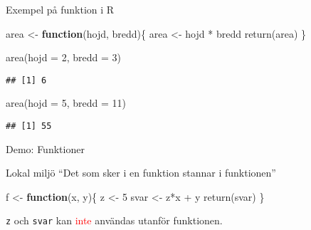 \documentclass[
  10pt,
  ignorenonframetext,
]{beamer}
\newenvironment{Shaded}{\begin{snugshade}}{\end{snugshade}}
\newcommand{\AttributeTok}[1]{\textcolor[rgb]{0.77,0.63,0.00}{#1}}
\newcommand{\ControlFlowTok}[1]{\textcolor[rgb]{0.13,0.29,0.53}{\textbf{#1}}}
\newcommand{\DecValTok}[1]{\textcolor[rgb]{0.00,0.00,0.81}{#1}}
\newcommand{\FunctionTok}[1]{\textcolor[rgb]{0.00,0.00,0.00}{#1}}
\newcommand{\NormalTok}[1]{#1}
\newcommand{\OtherTok}[1]{\textcolor[rgb]{0.56,0.35,0.01}{#1}}
\newcommand{\SpecialCharTok}[1]{\textcolor[rgb]{0.00,0.00,0.00}{#1}}
\begin{document}
\begin{frame}[fragile]{Exempel på funktion i R}
\protect\hypertarget{exempel-puxe5-funktion-i-r}{}
\begin{Shaded}
\begin{Highlighting}[]
\NormalTok{area }\OtherTok{\textless{}{-}} \ControlFlowTok{function}\NormalTok{(hojd, bredd)\{}
\NormalTok{  area }\OtherTok{\textless{}{-}}\NormalTok{ hojd }\SpecialCharTok{*}\NormalTok{ bredd}
  \FunctionTok{return}\NormalTok{(area)}
\NormalTok{\}}
\end{Highlighting}
\end{Shaded}

\begin{Shaded}
\begin{Highlighting}[]
\FunctionTok{area}\NormalTok{(}\AttributeTok{hojd =} \DecValTok{2}\NormalTok{, }\AttributeTok{bredd =} \DecValTok{3}\NormalTok{)}
\end{Highlighting}
\end{Shaded}

\begin{verbatim}
## [1] 6
\end{verbatim}

\begin{Shaded}
\begin{Highlighting}[]
\FunctionTok{area}\NormalTok{(}\AttributeTok{hojd =} \DecValTok{5}\NormalTok{, }\AttributeTok{bredd =} \DecValTok{11}\NormalTok{)}
\end{Highlighting}
\end{Shaded}

\begin{verbatim}
## [1] 55
\end{verbatim}
\end{frame}



\begin{frame}{Demo: Funktioner}

\end{frame}





\begin{frame}[fragile]{Lokal miljö}
\protect\hypertarget{lokal-miljuxf6}{}
``Det som sker i en funktion stannar i funktionen''

\begin{Shaded}
\begin{Highlighting}[]
\NormalTok{f }\OtherTok{\textless{}{-}} \ControlFlowTok{function}\NormalTok{(x, y)\{}
\NormalTok{  z }\OtherTok{\textless{}{-}} \DecValTok{5}
\NormalTok{  svar }\OtherTok{\textless{}{-}}\NormalTok{ z}\SpecialCharTok{*}\NormalTok{x }\SpecialCharTok{+}\NormalTok{ y }
  \FunctionTok{return}\NormalTok{(svar)}
\NormalTok{\}}
\end{Highlighting}
\end{Shaded}

\texttt{z} och \texttt{svar} kan \textcolor{red}{inte} användas utanför
funktionen.
\end{frame}
\end{document}
